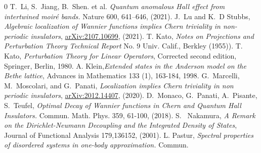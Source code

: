 \documentclass[reqno,12pt,letterpaper]{amsart}
\def\arXiv#1{\href{http://arxiv.org/abs/#1}{arXiv:#1}}
\numberwithin{equation}{section}
\begin{document}
\begin{thebibliography}{0}
 T.~Li, S.~Jiang, B.~Shen. et al. \emph{Quantum anomalous Hall effect from intertwined moiré bands.} Nature 600, 641–646, (2021).
 J.~Lu and K.~D Stubbs, {\emph{Algebraic localization of Wannier functions implies Chern triviality in non-periodic insulators}}, \arXiv{2107.10699}, (2021).
T. Kato, \emph{Notes on Projections and Perturbation Theory Technical Report}
No. 9 Univ. Calif., Berkley (1955)).
 T. Kato, \emph{Perturbation Theory for Linear Operators}, Corrected second edition, Springer, Berlin, 1980.   
 A. Klein,\emph{Extended
states in the Anderson model on the Bethe lattice}, Advances in Mathematics
133 (1), 163-184, 1998.   
G.~Marcelli, M.~Moscolari, and G.~Panati, \emph{Localization implies Chern triviality in non periodic insulators}, \arXiv{2012.14407}, (2020).
 D.~Monaco, G.~Panati, A.~Pisante, S.~Teufel, \emph{Optimal Decay of Wannier functions in Chern and Quantum Hall Insulators.} Commun. Math. Phys. 359, 61-100, (2018).
 S.~ Nakamura, \emph{A Remark on the Dirichlet-Neumann Decoupling and the Integrated Density of States}, Journal of Functional Analysis 179,136152, (2001).
 L. Pastur, \emph{Spectral properties of disordered systems in one-body approximation.} Commun.

\end{thebibliography}
\end{document}
